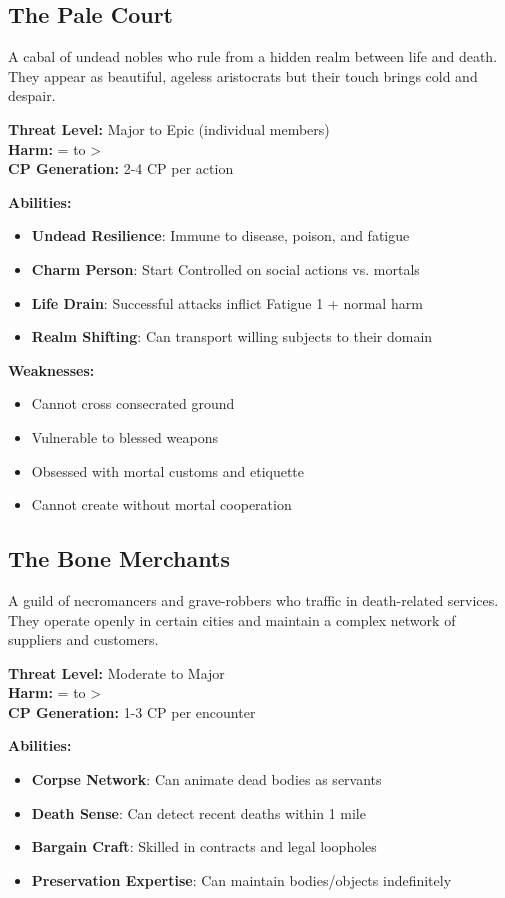 \documentclass[12pt]{article}
\begin{document}
\begin{itemize}
\subsection*{The Pale Court}

A cabal of undead nobles who rule from a hidden realm between life and death. They appear as beautiful, ageless aristocrats but their touch brings cold and despair.

\textbf{Threat Level:} Major to Epic (individual members) \\
\textbf{Harm:} = to > \\
\textbf{CP Generation:} 2-4 CP per action

\textbf{Abilities:}
\begin{itemize}
\item \textbf{Undead Resilience}: Immune to disease, poison, and fatigue
\item \textbf{Charm Person}: Start Controlled on social actions vs. mortals
\item \textbf{Life Drain}: Successful attacks inflict Fatigue 1 + normal harm
\item \textbf{Realm Shifting}: Can transport willing subjects to their domain
\end{itemize}

\textbf{Weaknesses:}
\begin{itemize}
\item Cannot cross consecrated ground
\item Vulnerable to blessed weapons
\item Obsessed with mortal customs and etiquette
\item Cannot create without mortal cooperation
\end{itemize}

\subsection*{The Bone Merchants}

A guild of necromancers and grave-robbers who traffic in death-related services. They operate openly in certain cities and maintain a complex network of suppliers and customers.

\textbf{Threat Level:} Moderate to Major \\
\textbf{Harm:} = to > \\
\textbf{CP Generation:} 1-3 CP per encounter

\textbf{Abilities:}
\begin{itemize}
\item \textbf{Corpse Network}: Can animate dead bodies as servants
\item \textbf{Death Sense}: Can detect recent deaths within 1 mile
\item \textbf{Bargain Craft}: Skilled in contracts and legal loopholes
\item \textbf{Preservation Expertise}: Can maintain bodies/objects indefinitely
\end{itemize}


\end{itemize}
\end{document}
